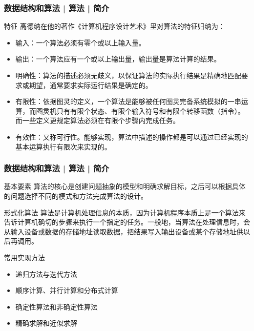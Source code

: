 \begin{frame}
  \frametitle{数据结构和算法 | 算法 | 简介}
  \begin{block}{特征}
高德纳在他的著作《计算机程序设计艺术》里对算法的特征归纳为：
\begin{itemize}
  \item 输入：一个算法必须有零个或以上输入量。
  \item 输出：一个算法应有一个或以上输出量，输出量是算法计算的结果。
  \item 明确性：算法的描述必须无歧义，以保证算法的实际执行结果是精确地匹配要求或期望，通常要求实际运行结果是确定的。
  \item 有限性：依据图灵的定义，一个算法是能够被任何图灵完备系统模拟的一串运算，而图灵机只有有限个状态、有限个输入符号和有限个转移函数（指令）。而一些定义更规定算法必须在有限个步骤内完成任务。
  \item 有效性：又称可行性。能够实现，算法中描述的操作都是可以通过已经实现的基本运算执行有限次来实现的。
\end{itemize}
  \end{block}
\end{frame}

\begin{frame}
  \frametitle{数据结构和算法 | 算法 | 简介}
  \begin{block}{基本要素}
算法的核心是\alert{创建问题抽象的模型和明确求解目标}，之后可以根据具体的问题选择不同的模式和方法完成算法的设计。
  \end{block}
  \pause
  \begin{block}{形式化算法}
算法是计算机处理信息的本质，因为\alert{计算机程序本质上是一个算法来告诉计算机确切的步骤来执行一个指定的任务}。一般地，当算法在处理信息时，会从输入设备或数据的存储地址读取数据，把结果写入输出设备或某个存储地址供以后再调用。
  \end{block}
  \pause
  \begin{block}{常用实现方法}
    \begin{itemize}
      \item 递归方法与迭代方法
      \item 顺序计算、并行计算和分布式计算
      \item 确定性算法和非确定性算法
      \item 精确求解和近似求解 
    \end{itemize}
  \end{block}
\end{frame}

